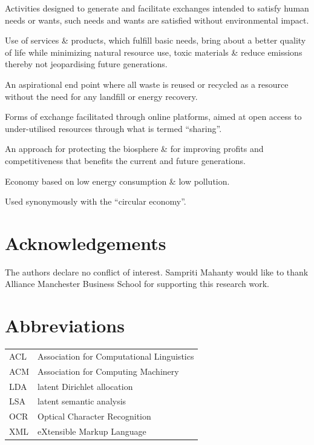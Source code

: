 \documentclass[output=paper]{langsci/langscibook}
\begin{document}
\begin{description}[font=\normalfont,noitemsep]
\item[``green marketing'':] Activities designed to generate and facilitate exchanges intended to satisfy human needs or wants, such needs and wants are satisfied without environmental impact.
\item[``sustainable consumption and production'':] Use of services \& products, which fulfill basic needs, bring about a better quality of life while minimizing natural resource use, toxic materials \& reduce emissions thereby not jeopardising future generations.
\item[``zero waste'':] An aspirational end point where all waste is reused or recycled as a resource without the need for any landfill or energy recovery.
\item[``sharing economy'':] Forms of exchange facilitated through online platforms, aimed at open access to under-utilised resources through what is termed ``sharing''.
\item[``natural capital'':] An approach for protecting the biosphere \& for improving profits and competitiveness that benefits the current and future generations.
\item[``low-carbon economy'':] Economy based on low energy consumption \& low pollution.
\item[``closed loop economy'':] Used synonymously with the ``circular economy''.
\end{description}

\section*{Acknowledgements}
The authors declare no conflict of interest. Sampriti Mahanty would like to thank Alliance Manchester Business School for supporting this research work.

\section*{Abbreviations}
\begin{tabularx}{\textwidth}{@{}lQ@{}}
ACL & Association for Computational Linguistics\\
ACM & Association for Computing Machinery\\
LDA & latent Dirichlet allocation\\
LSA & latent semantic analysis\\
OCR & Optical Character Recognition\\
XML & eXtensible Markup Language\\ 
\end{tabularx}

{\sloppy\printbibliography[heading=subbibliography,notkeyword=this]}
\end{document}
